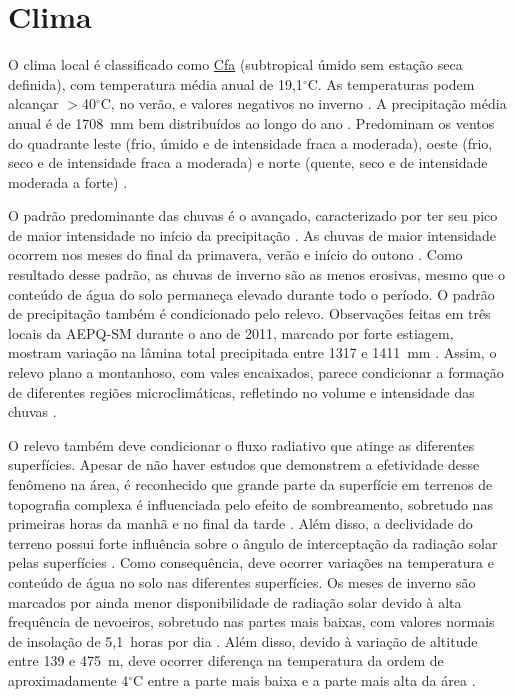 \documentclass[final]{article}
\begin{document}
\section{Clima}

O clima local é classificado como \href{http://pt.wikipedia.org/wiki/Clima_subtropical_\%C3\%BAmido}{Cfa} (subtropical úmido sem estação seca definida), com temperatura média anual de 19,1$^\circ$C. As temperaturas podem alcançar $>$40$^\circ$C, no verão, e valores negativos no inverno \cite{HeldweinEtAl2009}. A precipitação média anual é de 1708~mm bem distribuídos ao longo do ano \cite{Maluf2000}. Predominam os ventos do quadrante leste (frio, úmido e de intensidade fraca a moderada), oeste (frio, seco e de intensidade fraca a moderada) e norte (quente, seco e de intensidade moderada a forte) \cite{HeldweinEtAl2009}.

O padrão predominante das chuvas é o avançado, caracterizado por ter seu pico de maior intensidade no início da precipitação \cite{MehlEtAl2001}. As chuvas de maior intensidade ocorrem nos meses do final da primavera, verão e início do outono \cite{MouraBueno2012}. Como resultado desse padrão, as chuvas de inverno são as menos erosivas, mesmo que o conteúdo de água do solo permaneça elevado durante todo o período. O padrão de precipitação também é condicionado pelo relevo. Observações feitas em três locais da AEPQ-SM durante o ano de 2011, marcado por forte estiagem, mostram variação na lâmina total precipitada entre 1317 e 1411~mm \cite{MouraBueno2012}. Assim, o relevo plano a montanhoso, com vales encaixados, parece condicionar a formação de diferentes regiões microclimáticas, refletindo no volume e intensidade das chuvas \cite{MouraBueno2012}.

O relevo também deve condicionar o fluxo radiativo que atinge as diferentes superfícies. Apesar de não haver estudos que demonstrem a efetividade desse fenômeno na área, é reconhecido que grande parte da superfície em terrenos de topografia complexa é influenciada pelo efeito de sombreamento, sobretudo nas primeiras horas da manhã e no final da tarde \cite{OliphantEtAl2003}. Além disso, a declividade do terreno possui forte influência sobre o ângulo de interceptação da radiação solar pelas superfícies \cite{Birkeland1999}. Como consequência, deve ocorrer variações na temperatura e conteúdo de água no solo nas diferentes superfícies. Os meses de inverno são marcados por ainda menor disponibilidade de radiação solar devido à alta frequência de nevoeiros, sobretudo nas partes mais baixas, com valores normais de insolação de 5,1~horas por dia \cite{HeldweinEtAl2009}. Além disso, devido à variação de altitude entre 139 e 475~m, deve ocorrer diferença na temperatura da ordem de aproximadamente 4$^\circ$C entre a parte mais baixa e a parte mais alta da área \cite{HeldweinEtAl2009}.
\end{document}

